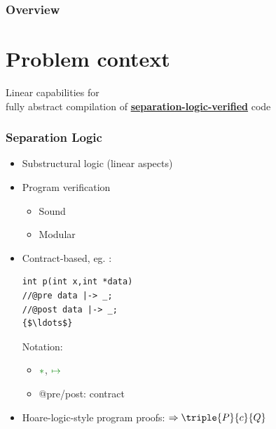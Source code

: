 \documentclass{beamer}
\begin{document}
\begin{frame}
\end{frame}

\begin{frame}
\frametitle{Overview} %
\tableofcontents %
\end{frame}

\section{Problem context}

\begin{frame}[plain,c]

\begin{center}
\Huge Linear capabilities for\\  fully abstract
compilation of \textbf{\underline{separation-logic-verified}} code
\end{center}
\end{frame}


\begin{frame}
\frametitle{Separation Logic} 
\begin{itemize}
\item Substructural logic (linear aspects)
\item Program verification
\begin{itemize}
\item Sound %
\item Modular %
\end{itemize}
\item Contract-based, eg. :
\begin{lstlisting}[style=CStyle, captionpos = t]
int p(int x,int *data)
//@pre data |-> _;
//@post data |-> _;
{$\ldots$}
\end{lstlisting}
Notation:
\begin{itemize}
\item $\textcolor{mGreen}{\ast}$, $\textcolor{mGreen}{\mapsto}$ 
\item @pre/post: contract
\end{itemize}
\item Hoare-logic-style program proofs: $\Rightarrow \triple{P}{c}{Q}$\\
\end{itemize}
\end{frame}
\end{document}
